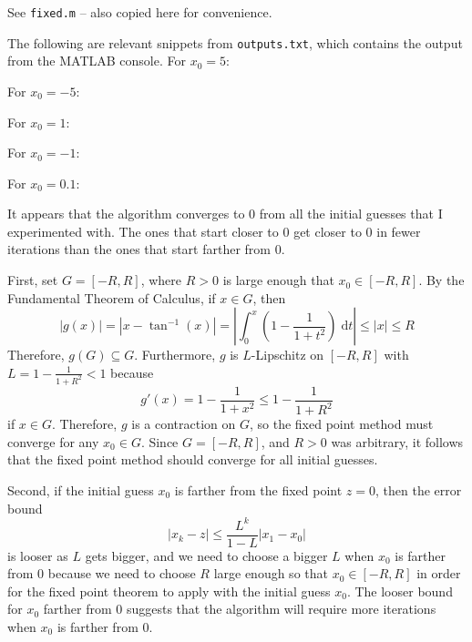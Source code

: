\documentclass{homework}
\begin{document}
\question

\begin{alphaparts}
	\questionpart See \verb*|fixed.m| -- also copied here for convenience.
	
	The following are relevant snippets from \verb*|outputs.txt|, which contains the output from the MATLAB console. For $x_0 = 5$:
	
  	For $x_0 = -5$:
  	
  	For $x_0 = 1$:
  	
  	For $x_0 = -1$:
  	
  	For $x_0 = 0.1$: 
	
	
	\questionpart It appears that the algorithm converges to $0$ from all the initial guesses that I experimented with. The ones that start closer to $0$ get closer to $0$ in fewer iterations than the ones that start farther from $0$.
	
	First, set $G = [-R, R]$, where $R > 0$ is large enough that $x_0 \in [-R, R]$. By the Fundamental Theorem of Calculus, if $x \in G$, then
	\begin{equation}
		|g(x)| = \left|x - \tan^{-1}(x)\right| = \left|\int_0^x\left(1 - \frac{1}{1+t^2}\right)\;\text{d}t\right| \le |x| \le R
	\end{equation}
	Therefore, $g(G) \subseteq G$. Furthermore, $g$ is $L$-Lipschitz on $[-R, R]$ with $L = 1 - \frac{1}{1+R^2} < 1$ because
	\begin{equation}
		g'(x) = 1-\frac{1}{1+x^2} \le 1-\frac{1}{1+R^2}
	\end{equation}
	if $x \in G$. Therefore, $g$ is a contraction on $G$, so the fixed point method must converge for any $x_0 \in G$. Since $G = [-R,R]$, and $R > 0$ was arbitrary, it follows that the fixed point method should converge for all initial guesses.
	
	Second, if the initial guess $x_0$ is farther from the fixed point $z=0$, then the error bound
	\begin{equation}
		|x_k - z| \le \frac{L^k}{1-L}|x_1 - x_0|
	\end{equation}
	is looser as $L$ gets bigger, and we need to choose a bigger $L$ when $x_0$ is farther from $0$ because we need to choose $R$ large enough so that $x_0 \in [-R, R]$ in order for the fixed point theorem to apply with the initial guess $x_0$. The looser bound for $x_0$ farther from $0$ suggests that the algorithm will require more iterations when $x_0$ is farther from $0$.
\end{alphaparts}
\end{document}
